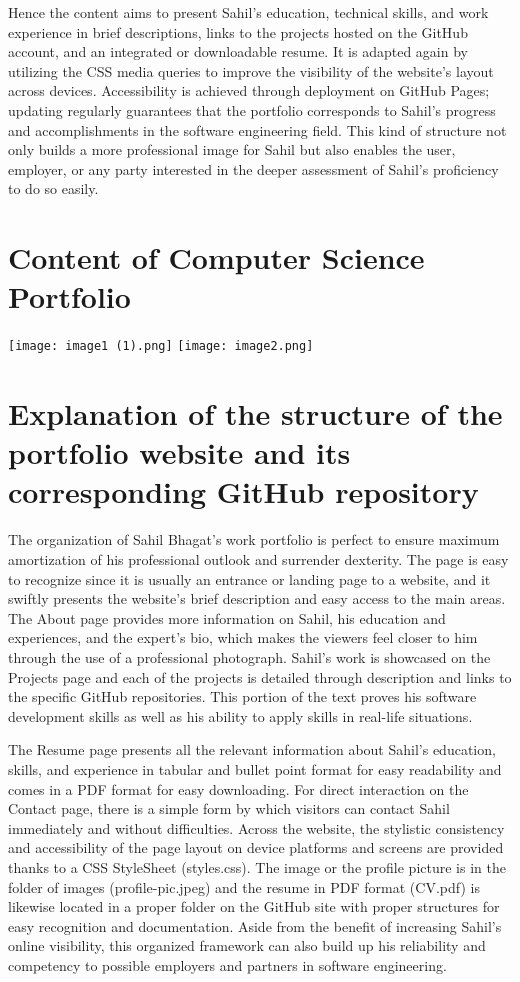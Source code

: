 \documentclass{article}
\begin{document}
Hence the content aims to present Sahil’s education, technical skills, and work experience in brief descriptions, links to the projects hosted on the GitHub account, and an integrated or downloadable resume. It is adapted again by utilizing the CSS media queries to improve the visibility of the website’s layout across devices. Accessibility is achieved through deployment on GitHub Pages; updating regularly guarantees that the portfolio corresponds to Sahil’s progress and accomplishments in the software engineering field. This kind of structure not only builds a more professional image for Sahil but also enables the user, employer, or any party interested in the deeper assessment of Sahil’s proficiency to do so easily.

\section{Content of Computer Science Portfolio}
\texttt{[image: image1 (1).png]}
\texttt{[image: image2.png]}

\section{Explanation of the structure of the portfolio website and its corresponding GitHub repository}
The organization of Sahil Bhagat’s work portfolio is perfect to ensure maximum amortization of his professional outlook and surrender dexterity. The page is easy to recognize since it is usually an entrance or landing page to a website, and it swiftly presents the website’s brief description and easy access to the main areas. The About page provides more information on Sahil, his education and experiences, and the expert’s bio, which makes the viewers feel closer to him through the use of a professional photograph. Sahil’s work is showcased on the Projects page and each of the projects is detailed through description and links to the specific GitHub repositories. This portion of the text proves his software development skills as well as his ability to apply skills in real-life situations. 

The Resume page presents all the relevant information about Sahil’s education, skills, and experience in tabular and bullet point format for easy readability and comes in a PDF format for easy downloading. For direct interaction on the Contact page, there is a simple form by which visitors can contact Sahil immediately and without difficulties. Across the website, the stylistic consistency and accessibility of the page layout on device platforms and screens are provided thanks to a CSS StyleSheet (styles.css). The image or the profile picture is in the folder of images (profile-pic.jpeg) and the resume in PDF format (CV.pdf) is likewise located in a proper folder on the GitHub site with proper structures for easy recognition and documentation. Aside from the benefit of increasing Sahil’s online visibility, this organized framework can also build up his reliability and competency to possible employers and partners in software engineering.
\end{document}
